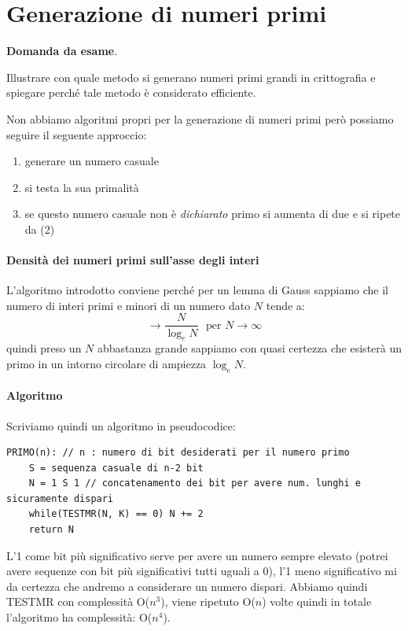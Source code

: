 \clearpage 

\section{Generazione di numeri primi}
\begin{framed}
	\noindent \textbf{Domanda da esame}.
	
	\noindent Illustrare con quale metodo si generano numeri primi grandi in crittografia e spiegare perché tale 	metodo è considerato efficiente.
\end{framed}
Non abbiamo algoritmi propri per la generazione di numeri primi però possiamo seguire il seguente approccio:
\begin{enumerate}
    \item generare un numero casuale
    \item si testa la sua primalità
    \item se questo numero casuale non è \emph{dichiarato} primo si aumenta di due e si ripete da (2)
\end{enumerate}
\paragraph{Densità dei numeri primi sull'asse degli interi} L'algoritmo introdotto conviene perché per un lemma di Gauss sappiamo che il numero di interi primi e minori di un numero dato $N$ tende a:
$$ \longrightarrow{} \frac{N}{\log_eN} \,\,\,\,\text{per }N \to \infty$$
quindi preso un $N$ abbastanza grande sappiamo con quasi certezza che esisterà un primo in un intorno circolare di ampiezza $\log_eN$.

\paragraph{Algoritmo} Scriviamo quindi un algoritmo in pseudocodice:
\begin{verbatim}
PRIMO(n): // n : numero di bit desiderati per il numero primo
    S = sequenza casuale di n-2 bit
    N = 1 S 1 // concatenamento dei bit per avere num. lunghi e sicuramente dispari
    while(TESTMR(N, K) == 0) N += 2
    return N
\end{verbatim}
L'1 come bit più significativo serve per avere un numero sempre elevato (potrei avere sequenze con bit più significativi tutti uguali a 0), l'1 meno significativo mi da certezza che andremo a considerare un numero dispari. Abbiamo quindi TESTMR con complessità O($n^3$), viene ripetuto O($n$) volte quindi in totale l'algoritmo ha complessità: O($n^4$). 


